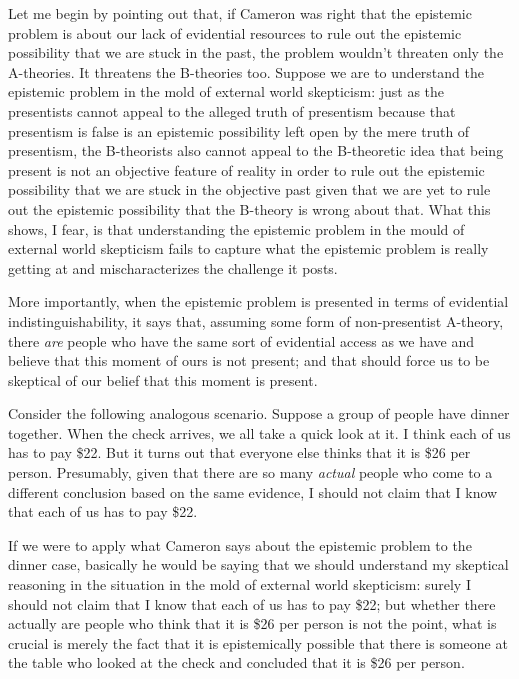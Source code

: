 \documentclass[a4paper,12pt]{article}
\begin{document}
Let me begin by pointing out that, if Cameron was right that the epistemic problem is about our lack of evidential resources to rule out the epistemic possibility that we are stuck in the past, the problem wouldn't threaten only the A-theories. It threatens the B-theories too. Suppose we are to understand the epistemic problem in the mold of external world skepticism: just as the presentists cannot appeal to the alleged truth of presentism because that presentism is false is an epistemic possibility left open by the mere truth of presentism, the B-theorists also cannot appeal to the B-theoretic idea that being present is not an objective feature of reality in order to rule out the epistemic possibility that we are stuck in the objective past given that we are yet to rule out the epistemic possibility that the B-theory is wrong about that. What this shows, I fear, is that understanding the epistemic problem in the mould of external world skepticism fails to capture what the epistemic problem is really getting at and mischaracterizes the challenge it posts.

More importantly, when the epistemic problem is presented in terms of evidential indistinguishability, it says that, assuming some form of non-presentist A-theory, there \emph{are} people who have the same sort of evidential access as we have and believe that this moment of ours is not present; and that should force us to be skeptical of our belief that this moment is present.

Consider the following analogous scenario. Suppose a group of people have dinner together. When the check arrives, we all take a quick look at it. I think each of us has to pay \$22. But it turns out that everyone else thinks that it is \$26 per person. Presumably, given that there are so many \emph{actual} people who come to a different conclusion based on the same evidence, I should not claim that I know that each of us has to pay \$22.

If we were to apply what Cameron says about the epistemic problem to the dinner case, basically he would be saying that we should understand my skeptical reasoning in the situation in the mold of external world skepticism: surely I should not claim that I know that each of us has to pay \$22; but whether there actually are people who think that it is \$26 per person is not the point, what is crucial is merely the fact that it is epistemically possible that there is someone at the table who looked at the check and concluded that it is \$26 per person.
\end{document}
